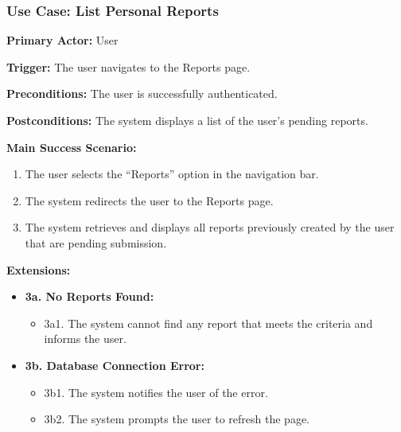 \subsubsection{\textbf{Use Case: List Personal Reports}}

\textbf{Primary Actor:} User

\textbf{Trigger:} The user navigates to the Reports page.

\textbf{Preconditions:} The user is successfully authenticated.

\textbf{Postconditions:} The system displays a list of the user’s pending reports.

\vspace{0.5cm}

\textbf{Main Success Scenario:}

\begin{enumerate} [leftmargin=0.75cm, noitemsep]
\item The user selects the ``Reports'' option in the navigation bar.
\item The system redirects the user to the Reports page.
\item The system retrieves and displays all reports previously created by the user that are pending submission.
\end{enumerate}

\vspace{0.3cm}

\textbf{Extensions:}

\begin{itemize} [label={}, leftmargin=0.75cm, noitemsep]

\item \textbf{3a. No Reports Found:}
\begin{itemize} [label={}, leftmargin=0.75cm, noitemsep]
    \item 3a1. The system cannot find any report that meets the criteria and informs the user.
\end{itemize}

\item \textbf{3b. Database Connection Error:}
\begin{itemize} [label={}, leftmargin=0.75cm, noitemsep]
    \item 3b1. The system notifies the user of the error.
    \item 3b2. The system prompts the user to refresh the page.
\end{itemize}

\end{itemize}

\vspace{0.3cm}
